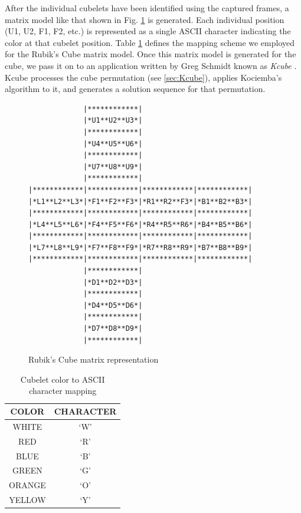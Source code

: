 \documentclass[final, letterpaper, 10 pt, conference, onecolumn]{IEEEtran}
\begin{document}
After the individual cubelets have been identified using the captured frames, a matrix model like that shown in Fig. \ref{fig:matrix layout} is generated. Each individual position (U1, U2, F1, F2, etc.) is represented as a single ASCII character indicating the color at that cubelet position. Table \ref{table:cubelet representation} defines the mapping scheme we employed for the Rubik's Cube matrix model. Once this matrix model is generated for the cube, we pass it on to an application written by Greg Schmidt known as \textit{Kcube} \cite{TheTwo-PhaseAlgorithm}. Kcube processes the cube permutation (see \ref{sec:Kcube}), applies Kociemba's algorithm to it, and generates a solution sequence for that permutation.
\begin{figure}[!ht]
\begin{center}
\begin{BVerbatim}
             |************|
             |*U1**U2**U3*|
             |************|
             |*U4**U5**U6*|
             |************|
             |*U7**U8**U9*|
             |************|
|************|************|************|************|
|*L1**L2**L3*|*F1**F2**F3*|*R1**R2**F3*|*B1**B2**B3*|
|************|************|************|************|
|*L4**L5**L6*|*F4**F5**F6*|*R4**R5**R6*|*B4**B5**B6*|
|************|************|************|************|
|*L7**L8**L9*|*F7**F8**F9*|*R7**R8**R9*|*B7**B8**B9*|
|************|************|************|************|
             |************|
             |*D1**D2**D3*|
             |************|
             |*D4**D5**D6*|
             |************|
             |*D7**D8**D9*|
             |************|
\end{BVerbatim}
\end{center}
\caption{Rubik's Cube matrix representation}
\label{fig:matrix layout}
\end{figure}

\begin{table}[!ht]
\caption{Cubelet color to ASCII character mapping}
\label{table:cubelet representation}
\centering
\begin{tabular}{|c|c|}
\hline
\textbf{COLOR} & \textbf{CHARACTER} \\ \hline
WHITE          & `W'              \\ \hline
RED            & `R'              \\ \hline
BLUE           & `B'              \\ \hline
GREEN          & `G'              \\ \hline
ORANGE         & `O'              \\ \hline
YELLOW         & `Y'              \\ \hline
\end{tabular}
\end{table}
\end{document}
